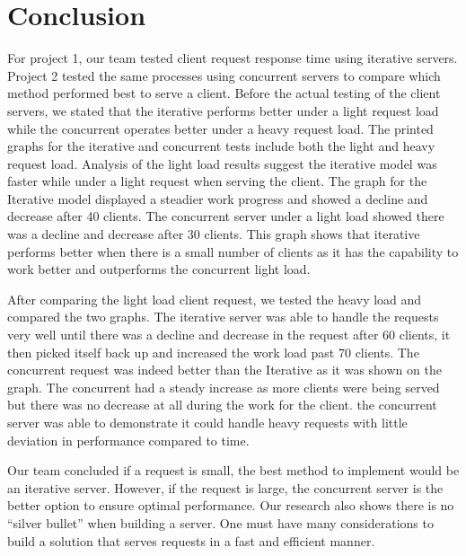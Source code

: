 \section{Conclusion}

For project 1, our team tested client request response time using iterative servers. 
Project 2 tested the same processes using concurrent servers to compare which method performed best to serve a client. 
Before the actual testing of the client servers, we stated that the iterative performs better under a light request load while the concurrent operates better under a heavy request load. 
The printed graphs for the iterative and concurrent tests include both the light and heavy request load. 
Analysis of the light load results suggest the iterative model was faster while under a light request when serving the client. 
The graph for the Iterative model displayed a steadier work progress and showed a decline and decrease after 40 clients. 
The concurrent server under a light load showed there was a decline and decrease after 30 clients. 
This graph shows that iterative performs better when there is a small number of clients as it has the capability to work better and outperforms the concurrent light load. 

After comparing the light load client request, we tested the heavy load and compared the two graphs. 
The iterative server was able to handle the requests very well until there was a decline and decrease in the request after 60 clients, it then picked itself back up and increased the work load past 70 clients. 
The concurrent request was indeed better than the Iterative as it was shown on the graph. The concurrent had a steady increase as more clients were being served but there was no decrease at all during the work for the client. 
the concurrent server was able to demonstrate it could handle heavy requests with little deviation in performance compared to time.

Our team concluded if a request is small, the best method to implement would be an iterative server. 
However, if the request is large, the concurrent server is the better option to ensure optimal performance. 
Our research also shows there is no ``silver bullet'' when building a server. 
One must have many considerations to build a solution that serves requests in a fast and efficient manner.
